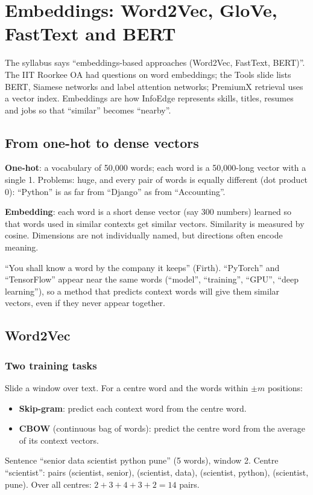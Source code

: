 \chapter{Embeddings: Word2Vec, GloVe, FastText and BERT}

The syllabus says ``embeddings-based approaches (Word2Vec, FastText, BERT)''. The IIT Roorkee OA had questions on word embeddings;
the Tools slide lists BERT, Siamese networks and label attention networks; PremiumX retrieval uses a vector index. Embeddings are how
InfoEdge represents skills, titles, resumes and jobs so that ``similar'' becomes ``nearby''.

\section{From one-hot to dense vectors}
\textbf{One-hot}: a vocabulary of 50{,}000 words; each word is a 50{,}000-long vector with a single 1. Problems: huge, and every pair of
words is equally different (dot product 0): ``Python'' is as far from ``Django'' as from ``Accounting''.

\textbf{Embedding}: each word is a short dense vector (say 300 numbers) learned so that words used in similar contexts get similar vectors.
Similarity is measured by cosine. Dimensions are not individually named, but directions often encode meaning.

\begin{intuition}
``You shall know a word by the company it keeps'' (Firth). ``PyTorch'' and ``TensorFlow'' appear near the same words (``model'',
``training'', ``GPU'', ``deep learning''), so a method that predicts context words will give them similar vectors, even if they never
appear together.
\end{intuition}

\section{Word2Vec}
\subsection{Two training tasks}
Slide a window over text. For a centre word and the words within $\pm m$ positions:
\begin{itemize}
\item \textbf{Skip-gram}: predict each context word from the centre word.
\item \textbf{CBOW} (continuous bag of words): predict the centre word from the average of its context vectors.
\end{itemize}
\begin{example}
Sentence ``senior data scientist python pune'' (5 words), window 2. Centre ``scientist'': pairs (scientist, senior), (scientist, data),
(scientist, python), (scientist, pune). Over all centres: $2 + 3 + 4 + 3 + 2 = 14$ pairs.
\end{example}

